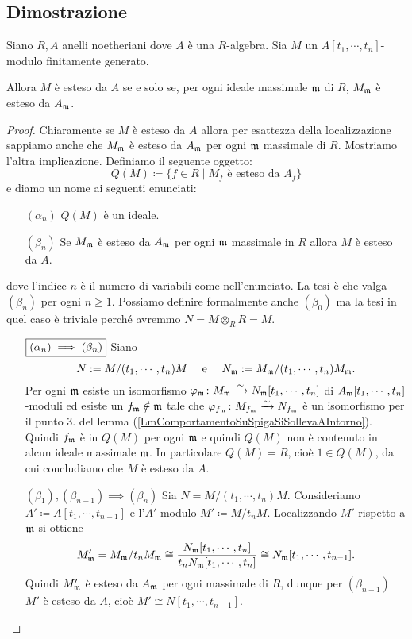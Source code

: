 \subsection{Dimostrazione}
\begin{theorem}\label{ThIncollamentoQuillen}
Siano $R,A$ anelli noetheriani dove $A$ è una $R$-algebra. Sia $M$ un $A[t_1,\cdots,t_n]$-modulo finitamente generato. 

Allora $M$ è esteso da $A$ se e solo se, per ogni ideale massimale $\mathfrak{m}$ di $R$, $M_{\mathfrak{m}}$ è esteso da $A_{\mathfrak{m}}$.
\end{theorem}
\begin{proof}
Chiaramente se $M$ \`e esteso da $A$ allora per esattezza della localizzazione sappiamo anche che $M_{\mathfrak{m}}$ \`e esteso da $A_{\mathfrak{m}}$ per ogni $\mathfrak{m}$ massimale di $R$. Mostriamo l'altra implicazione. 
Definiamo il seguente oggetto:
\[Q(M)\coloneqq\{f\in R\mid M_f \text{ è esteso da } A_f\}\]
e diamo un nome ai seguenti enunciati:
\setlength{\leftmargini}{0cm}
\begin{enumerate}
\item[$(\alpha_n)$] $Q(M)$ è un ideale.
\item[$(\beta_n)$] Se $M_{\mathfrak{m}}$ è esteso da $A_{\mathfrak{m}}$ per ogni $\mathfrak{m}$ massimale in $R$ allora $M$ è esteso da $A$.
\end{enumerate}
\setlength{\leftmargini}{0.5cm}
dove l'indice $n$ \`e il numero di variabili come nell'enunciato. La tesi \`e che valga $(\beta_n)$ per ogni $n\geq 1$. Possiamo definire formalmente anche $(\beta_0)$ ma la tesi in quel caso \`e triviale perch\'e avremmo $N=M\otimes_{R}R=M$.

\setlength{\leftmargini}{0cm}
\begin{itemize}
\item[$\boxed{(\alpha_n)\implies(\beta_n)}$] Siano \[N:= M/(t_1,\cdots,t_n)M \quad \text{ e } \quad N_{\mathfrak{m}}:= M_{\mathfrak{m}}/(t_1,\cdots,t_n)M_{\mathfrak{m}}.\] Per ogni $\mathfrak{m}$ esiste un isomorfismo $\varphi_{\mathfrak{m}}\colon M_{\mathfrak{m}} \xrightarrow{\sim} N_{\mathfrak{m}}[t_1,\cdots,t_n]$ di $A_{\mathfrak{m}}[t_1,\cdots,t_n]$-moduli ed esiste un $f_{\mathfrak{m}}\notin \mathfrak{m}$ tale che $\varphi_{f_{\mathfrak{m}}}\colon M_{f_{\mathfrak{m}}}\xrightarrow{\sim} N_{f_{\mathfrak{m}}}$ è un isomorfismo per il punto 3. del lemma (\ref{LmComportamentoSuSpigaSiSollevaAIntorno}). Quindi $f_{\mathfrak{m}}$ è in $Q(M)$ per ogni $\mathfrak{m}$ e quindi $Q(M)$ non è contenuto in alcun ideale massimale $\mathfrak{m}$. In particolare $Q(M)=R$, cioè $1\in Q(M)$, da cui concludiamo che $M$ è esteso da $A$. 
\item[$\boxed{(\beta_1),(\beta_{n-1})\implies(\beta_n)}$] Sia $N=M/(t_1,\cdots,t_n)M$. Consideriamo $A'\coloneqq A[t_1,\cdots,t_{n-1}]$ e l'$A'$-modulo $M'\coloneqq M/t_n M$. 
Localizzando $M'$ rispetto a $\mathfrak{m}$ si ottiene 
\[M'_{\mathfrak{m}}=M_{\mathfrak{m}}/t_n M_{\mathfrak{m}}\cong \frac{N_{\mathfrak{m}}[t_1,\cdots,t_n]}{t_n N_{\mathfrak{m}}[t_1,\cdots,t_n]}\cong N_{\mathfrak{m}}[t_1,\cdots,t_{n-1}].\] 
Quindi $M'_{\mathfrak{m}}$ è esteso da $A_{\mathfrak{m}}$ per ogni massimale di $R$, dunque per $(\beta_{n-1})$ $M'$ è esteso da $A$, cioè $M'\cong N[t_1,\cdots,t_{n-1}]$.


\end{itemize}
\end{proof}
